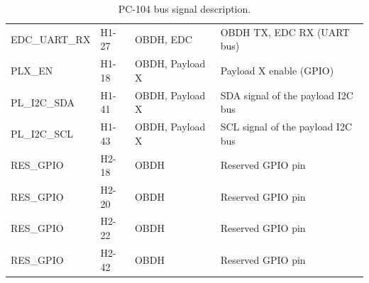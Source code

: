 \begin{table}[!h]
\begin{tabular}{lL{0.2\textwidth}L{0.15\textwidth}L{0.35\textwidth}}
        EDC\_UART\_RX   & H1-27           & OBDH, EDC            & OBDH TX, EDC RX (UART bus) \\
        PLX\_EN         & H1-18           & OBDH, Payload X      & Payload X enable (GPIO) \\
        PL\_I2C\_SDA    & H1-41           & OBDH, Payload X      & SDA signal of the payload I2C bus \\
        PL\_I2C\_SCL    & H1-43           & OBDH, Payload X      & SCL signal of the payload I2C bus \\
        RES\_GPIO       & H2-18           & OBDH                 & Reserved GPIO pin \\
        RES\_GPIO       & H2-20           & OBDH                 & Reserved GPIO pin \\
        RES\_GPIO       & H2-22           & OBDH                 & Reserved GPIO pin \\
        RES\_GPIO       & H2-42           & OBDH                 & Reserved GPIO pin \\
        \bottomrule[1.5pt]
    \end{tabular}
    \caption{PC-104 bus signal description.}
    \label{tab:pc104-signals}
\end{table}
